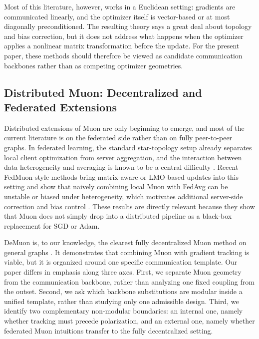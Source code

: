 \documentclass{article}
\begin{document}
Most of this literature, however, works in a Euclidean setting: gradients are communicated linearly, and the optimizer itself is vector-based or at most diagonally preconditioned. The resulting theory says a great deal about topology and bias correction, but it does not address what happens when the optimizer applies a nonlinear matrix transformation before the update. For the present paper, these methods should therefore be viewed as candidate communication backbones rather than as competing optimizer geometries.


\subsection{Distributed Muon: Decentralized and Federated Extensions}


Distributed extensions of Muon are only beginning to emerge, and most of the current literature is on the federated side rather than on fully peer-to-peer graphs. In federated learning, the standard star-topology setup already separates local client optimization from server aggregation, and the interaction between data heterogeneity and averaging is known to be a central difficulty \citep{mcmahan2017communication,kairouz2021advances}. Recent FedMuon-style methods bring matrix-aware or LMO-based updates into this setting and show that naively combining local Muon with FedAvg can be unstable or biased under heterogeneity, which motivates additional server-side correction and bias control \citep{takezawa2025fedmuon,liu2025fedmuon}. These results are directly relevant because they show that Muon does not simply drop into a distributed pipeline as a black-box replacement for SGD or Adam.



DeMuon is, to our knowledge, the clearest fully decentralized Muon method on general graphs \citep{he2025demuon}. It demonstrates that combining Muon with gradient tracking is viable, but it is organized around one specific communication template. Our paper differs in emphasis along three axes. First, we separate Muon geometry from the communication backbone, rather than analyzing one fixed coupling from the outset. Second, we ask which backbone substitutions are modular inside a unified template, rather than studying only one admissible design. Third, we identify two complementary non-modular boundaries: an internal one, namely whether tracking must precede polarization, and an external one, namely whether federated Muon intuitions transfer to the fully decentralized setting.
\end{document}
